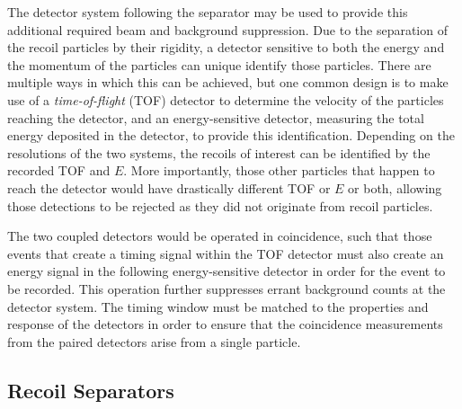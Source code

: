 The detector system following the separator may be used to provide this
additional required beam and background suppression. Due to the separation of
the recoil particles by their rigidity, a detector sensitive to both the energy
and the momentum of the particles can unique identify those particles. There
are multiple ways in which this can be achieved, but one common design is to
make use of a \textit{time-of-flight} (TOF) detector to determine the velocity
of the particles reaching the detector, and an energy-sensitive detector,
measuring the total energy deposited in the detector, to provide this
identification. Depending on the resolutions of the two systems, the recoils of
interest can be identified by the recorded TOF and $E$. More importantly, those
other particles that happen to reach the detector would have drastically
different TOF or $E$ or both, allowing those detections to be rejected as they
did not originate from recoil particles.

The two coupled detectors would be operated in coincidence, such that those
events that create a timing signal within the TOF detector must also create an
energy signal in the following energy-sensitive detector in order for the
event to be recorded. This operation further suppresses errant background
counts at the detector system. The timing window must be matched to the
properties and response of the detectors in order to ensure that the
coincidence measurements from the paired detectors arise from a single
particle.


\subsection{Recoil Separators}
\label{sec:ch01-recoil-separators}


